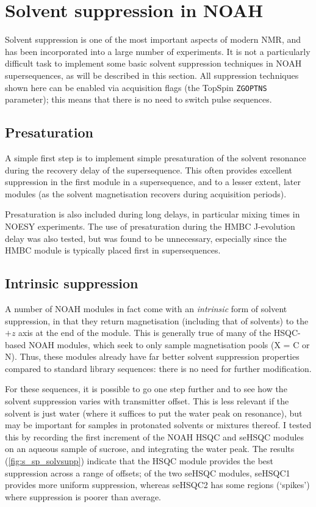 \section{Solvent suppression in NOAH}
\label{sec:noah__solvsupp}

Solvent suppression is one of the most important aspects of modern NMR, and has been incorporated into a large number of experiments.
It is not a particularly difficult task to implement some basic solvent suppression techniques in NOAH supersequences, as will be described in this section.
All suppression techniques shown here can be enabled via acquisition flags (the TopSpin \texttt{ZGOPTNS} parameter); this means that there is no need to switch pulse sequences.


\subsection{Presaturation}
\label{subsec:noah__solvsupp_presat}

A simple first step is to implement simple presaturation of the solvent resonance during the recovery delay of the supersequence.
This often provides excellent suppression in the first module in a supersequence, and to a lesser extent, later modules (as the solvent magnetisation recovers during acquisition periods).

Presaturation is also included during long delays, in particular mixing times in NOESY experiments.
The use of presaturation during the HMBC J-evolution delay was also tested, but was found to be unnecessary, especially since the HMBC module is typically placed first in supersequences.


\subsection{Intrinsic suppression}
\label{subsec:noah__solvsupp_intrinsic}

A number of NOAH modules in fact come with an \textit{intrinsic} form of solvent suppression, in that they return  magnetisation (including that of solvents) to the $+z$ axis at the end of the module.
This is generally true of many of the HSQC-based NOAH modules, which seek to only sample  magnetisation pools (X = C or N).
Thus, these modules already have far better solvent suppression properties compared to standard library sequences: there is no need for further modification.

For these sequences, it is possible to go one step further and to see how the solvent suppression varies with transmitter offset.
This is less relevant if the solvent is just water (where it suffices to put the water peak on resonance), but may be important for samples in protonated solvents or mixtures thereof.
I tested this by recording the first increment of the NOAH HSQC and seHSQC modules on an aqueous sample of sucrose, and integrating the water peak.
The results (\cref{fig:s_sp_solvsupp}) indicate that the HSQC module provides the best suppression across a range of offsets; of the two seHSQC modules, seHSQC1 provides more uniform suppression, whereas seHSQC2 has some regions (`spikes') where suppression is poorer than average.

